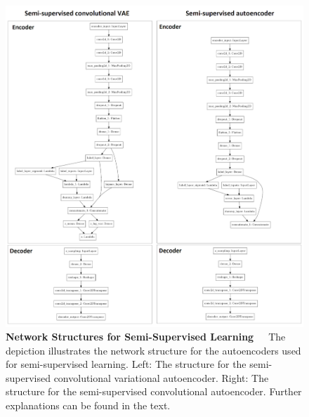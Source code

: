 \begin{figure}[h]
	\centering
	\includegraphics[scale=0.8]{Figures/chapter04/semi_supervised_network.png}
	\decoRule
	\caption[Network Structures for Semi-Supervised Learning]{\textbf{Network Structures for Semi-Supervised Learning}~~~The depiction illustrates the network structure for the autoencoders used for semi-supervised learning. Left: The structure for the semi-supervised convolutional variational autoencoder. Right: The structure for the semi-supervised convolutional autoencoder. Further explanations can be found in the text.}
	\label{fig:SemiSupervisedNetworkStructures}
\end{figure}

